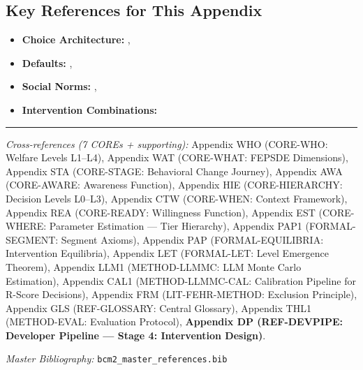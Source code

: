 \subsection{Key References for This Appendix}

\begin{itemize}[nosep]
    \item \textbf{Choice Architecture:} \citet{thalersunstein2008}, \citet{johnson2012}
    \item \textbf{Defaults:} \citet{madrian2001}, \citet{chetty2014}
    \item \textbf{Social Norms:} \citet{allcott2011}, \citet{cialdini2003}
    \item \textbf{Intervention Combinations:} \citet{johnson2021}
\end{itemize}

\nocite{bcm_master}



\vspace{1em}
\hrule
\vspace{0.5em}

\noindent\textit{Cross-references (7 COREs + supporting):}
Appendix WHO (CORE-WHO: Welfare Levels L1--L4),
Appendix WAT (CORE-WHAT: FEPSDE Dimensions),
Appendix STA (CORE-STAGE: Behavioral Change Journey),
Appendix AWA (CORE-AWARE: Awareness Function),
Appendix HIE (CORE-HIERARCHY: Decision Levels L0--L3),
Appendix CTW (CORE-WHEN: Context Framework),
Appendix REA (CORE-READY: Willingness Function),
Appendix EST (CORE-WHERE: Parameter Estimation --- Tier Hierarchy),
Appendix PAP1 (FORMAL-SEGMENT: Segment Axioms),
Appendix PAP (FORMAL-EQUILIBRIA: Intervention Equilibria),
Appendix LET (FORMAL-LET: Level Emergence Theorem),
Appendix LLM1 (METHOD-LLMMC: LLM Monte Carlo Estimation),
Appendix CAL1 (METHOD-LLMMC-CAL: Calibration Pipeline for R-Score Decisions),
Appendix FRM (LIT-FEHR-METHOD: Exclusion Principle),
Appendix GLS (REF-GLOSSARY: Central Glossary),
Appendix THL1 (METHOD-EVAL: Evaluation Protocol),
\textbf{Appendix DP (REF-DEVPIPE: Developer Pipeline --- Stage 4: Intervention Design)}.

\noindent\textit{Master Bibliography:} \texttt{bcm2\_master\_references.bib}


